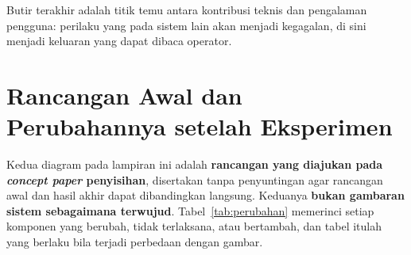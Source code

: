 Butir terakhir adalah titik temu antara kontribusi teknis dan pengalaman
pengguna: perilaku yang pada sistem lain akan menjadi kegagalan, di sini menjadi
keluaran yang dapat dibaca operator.

\section{Rancangan Awal dan Perubahannya setelah Eksperimen}
\label{app:diagram}

Kedua diagram pada lampiran ini adalah \textbf{rancangan yang diajukan pada
\emph{concept paper} penyisihan}, disertakan tanpa penyuntingan agar rancangan
awal dan hasil akhir dapat dibandingkan langsung. Keduanya
\textbf{bukan gambaran sistem sebagaimana terwujud}. Tabel~\ref{tab:perubahan}
memerinci setiap komponen yang berubah, tidak terlaksana, atau bertambah, dan
tabel itulah yang berlaku bila terjadi perbedaan dengan gambar.

